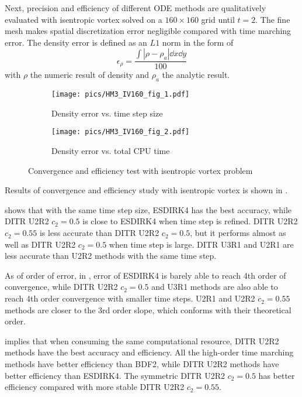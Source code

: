 Next, precision and efficiency of different ODE methods are
qualitatively evaluated with isentropic vortex solved on a $160\times160$
grid until $t=2$.
The fine mesh makes spatial
discretization error negligible compared with
time marching error.
The density error is defined as an $L1$ norm in the form of
\begin{equation}
    \epsilon_\rho = \frac{\int{|\rho-\rho_a| \dd x\dd y}}{
        100
    }
\end{equation}
with  $\rho$ the numeric result of density
and $\rho_a$ the analytic result.



\begin{figure}[htbp]
    \centering
    \begin{subfigure}{0.5\textwidth}
        \texttt{[image: pics/HM3\_IV160\_fig\_1.pdf]}
        \caption[]{Density error vs. time step size }
        \label{sfig:IVTests_Conv}
    \end{subfigure}\hfill
    \begin{subfigure}{0.5\textwidth}
        \texttt{[image: pics/HM3\_IV160\_fig\_2.pdf]}
        \caption[]{Density error vs. total CPU time}
        \label{sfig:IVTests_Eff}
    \end{subfigure}
    \caption[]{Convergence and efficiency test with isentropic vortex problem}
    \label{fig:IVTests}
\end{figure}

Results of convergence and efficiency study with isentropic vortex is
shown in .

 shows that with the same time step size,
ESDIRK4 has the best accuracy, while DITR U2R2 $c_2=0.5$ is close to
ESDIRK4 when time step is refined. DITR U2R2 $c_2=0.55$ is less accurate
than DITR U2R2 $c_2=0.5$, but it performs almost as well as
DITR U2R2 $c_2=0.5$ when time step is large.
DITR U3R1 and U2R1 are less accurate than U2R2 methods with
the same time step.

As of order of error, in ,
error of ESDIRK4 is barely able to reach 4th order of convergence,
while DITR U2R2 $c_2=0.5$ and U3R1 methods are also able to reach
4th order convergence with smaller time steps. U2R1 and U2R2 $c_2=0.55$
methods are closer to the 3rd order slope, which conforms with
their theoretical order.

implies that when consuming the same computational resource,
DITR U2R2 methods have the best accuracy and efficiency.
All the high-order
time marching methods have better efficiency than BDF2,
while DITR U2R2 methods have better efficiency than ESDIRK4.
The symmetric DITR U2R2 $c_2=0.5$ has better efficiency
compared with more stable DITR U2R2 $c_2=0.55$.


